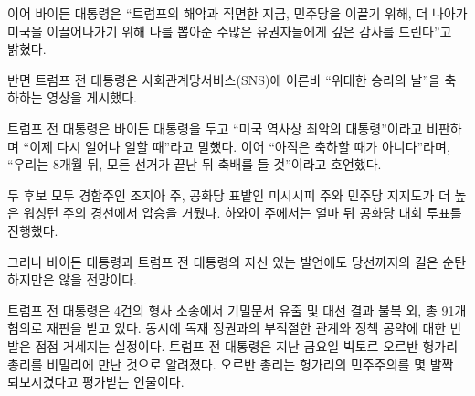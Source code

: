 \documentclass{translation}
\begin{document}
이어 바이든 대통령은 ``트럼프의 해악과 직면한 지금, 민주당을 이끌기 위해, 더 나아가 미국을 이끌어나가기 위해 나를 뽑아준 수많은 유권자들에게 깊은 감사를 드린다''고 밝혔다.

반면 트럼프 전 대통령은 사회관계망서비스(SNS)에 이른바 ``위대한 승리의 날''을 축하하는 영상을 게시했다.

트럼프 전 대통령은 바이든 대통령을 두고 ``미국 역사상 최악의 대통령''이라고 비판하며 ``이제 다시 일어나 일할 때''라고 말했다.
이어 ``아직은 축하할 때가 아니다''라며, ``우리는 8개월 뒤, 모든 선거가 끝난 뒤 축배를 들 것''이라고 호언했다.

두 후보 모두 경합주인 조지아 주, 공화당 표밭인 미시시피 주와 민주당 지지도가 더 높은 워싱턴 주의 경선에서 압승을 거뒀다.
하와이 주에서는 얼마 뒤 공화당 대회 투표를 진행했다.

그러나 바이든 대통령과 트럼프 전 대통령의 자신 있는 발언에도 당선까지의 길은 순탄하지만은 않을 전망이다.

트럼프 전 대통령은 4건의 형사 소송에서 기밀문서 유출 및 대선 결과 불복 외, 총 91개 혐의로 재판을 받고 있다.
동시에 독재 정권과의 부적절한 관계와 정책 공약에 대한 반발은 점점 거세지는 실정이다.
트럼프 전 대통령은 지난 금요일 빅토르 오르반 헝가리 총리를 비밀리에 만난 것으로 알려졌다.
오르반 총리는 헝가리의 민주주의를 몇 발짝 퇴보시켰다고 평가받는 인물이다.
\end{document}
